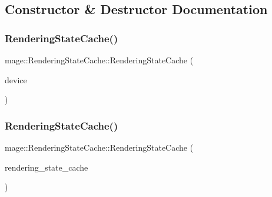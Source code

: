 \subsection{Constructor \& Destructor Documentation}
\hypertarget{structmage_1_1_rendering_state_cache_ad818eaa6c950c5851d6e684b9a4b3a65}{}\label{structmage_1_1_rendering_state_cache_ad818eaa6c950c5851d6e684b9a4b3a65} 
\subsubsection{\texorpdfstring{Rendering\+State\+Cache()}{RenderingStateCache()}\hspace{0.1cm}{\footnotesize\ttfamily [1/3]}}
{\footnotesize\ttfamily mage\+::\+Rendering\+State\+Cache\+::\+Rendering\+State\+Cache (\begin{DoxyParamCaption}\item[{I\+D3\+D11\+Device2 $\ast$}]{device }\end{DoxyParamCaption})\hspace{0.3cm}{\ttfamily [explicit]}}

\hypertarget{structmage_1_1_rendering_state_cache_a47c0f5527ce10ca9b6a059946efda239}{}\label{structmage_1_1_rendering_state_cache_a47c0f5527ce10ca9b6a059946efda239} 
\subsubsection{\texorpdfstring{Rendering\+State\+Cache()}{RenderingStateCache()}\hspace{0.1cm}{\footnotesize\ttfamily [2/3]}}
{\footnotesize\ttfamily mage\+::\+Rendering\+State\+Cache\+::\+Rendering\+State\+Cache (\begin{DoxyParamCaption}\item[{const \hyperlink{structmage_1_1_rendering_state_cache}{Rendering\+State\+Cache} \&}]{rendering\+\_\+state\+\_\+cache }\end{DoxyParamCaption})\hspace{0.3cm}{\ttfamily [delete]}}

